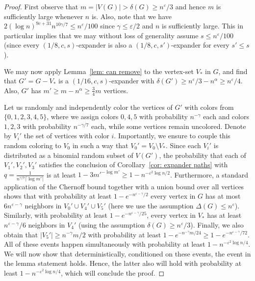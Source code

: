 \documentclass[11pt,reqno]{article}
\begin{document}
\begin{proof}
     First observe that $m=|V(G)|>\delta(G)\ge n^\varepsilon/3$ and hence $m$ is sufficiently large whenever $n$ is. Also, note that we have $2(\log n)^{9c+31}n^{10\gamma/7}\le n^{\varepsilon}/100$ since $\gamma\leq \varepsilon/2$ and $n$ is sufficiently large. This in particular implies that we may without loss of generality assume $s\le n^\varepsilon/100$ (since every $(1/8,c,s)$-expander is also a $(1/8,c,s')$-expander for every $s'\le s$).

     We may now apply Lemma~\ref{lem: can remove} to the vertex-set $V_*$ in $G$, and find that $G' = G-V_*$ is a $(1/16,c,s)$-expander with $\delta(G')\geq n^{\varepsilon}/3-n^{\alpha}\geq n^{\varepsilon}/4$. Also, $G'$ has $m'\ge m-n^\alpha\ge \frac{3}{4}m$ vertices.

     Let us randomly and independently color the vertices of $G'$ with colors from $\{0,1,2,3,4,5\}$, where we assign colors $0,4,5$ with probability $n^{-\gamma}$ each and colors $1,2,3$ with probability $n^{-\gamma/7}$ each, while some vertices remain uncolored. Denote by $V_i'$ the set of vertices with color $i$. Importantly, we ensure to couple this random coloring to $V_0$ in such a way that $V_{0}'=V_0\setminus V_*$.
     Since each $V_i'$ is distributed as a binomial random subset of $V(G')$, the probability that each of $V_1',V_2',V_3'$ satisfies the conclusion of Corollary~\ref{cor: expander paths} with $q=\frac{1}{n^{\gamma/7}\lceil \log m'\rceil}$ is at least $1-3m'^{-\log m'}\geq 1-n^{-\varepsilon^2\log n/2}$. Furthermore, a standard application of the Chernoff bound together with a union bound over all vertices shows that with probability at least $1-e^{-n^{\varepsilon-\gamma}/2}$ every vertex in $G$ has at most $6n^{\varepsilon-\gamma}$ neighbors in $V_0'\cup V_4'\cup V_5'$ (here we use the assumption $\Delta(G)\le n^\varepsilon$). Similarly, with probability at least $1-e^{-n^{\varepsilon-\gamma}/25}$, every vertex in $V_*$ has at least $n^{\varepsilon-\gamma}/6$ neighbors in $V_4'$ (using the assumption $\delta(G)\ge n^\varepsilon/3$). Finally, we also obtain that $|V_5'|\geq n^{-\gamma}m/2$ with probability at least $1-e^{-n^{-\gamma}m/24}\ge 1-e^{-n^{\varepsilon-\gamma}/72}$. All of these events happen simultaneously with probability at least $1-n^{-\varepsilon^2\log n/4}$. We will now show that deterministically, conditioned on these events, the event in the lemma statement holds. Hence, the latter also will hold with probability at least $1-n^{-\varepsilon^2\log n/4}$, which will conclude the proof. 


\end{proof}
\end{document}

